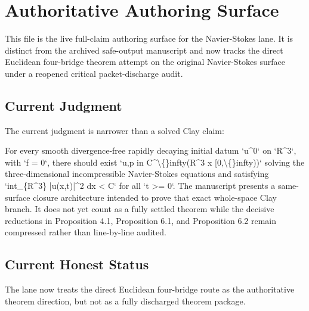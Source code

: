\section{Authoritative Authoring Surface}


This file is the live full-claim authoring surface for the Navier-Stokes lane.
It is distinct from the archived safe-output manuscript and now tracks the
direct Euclidean four-bridge theorem attempt on the original Navier-Stokes
surface under a reopened critical packet-discharge audit.

\subsection{Current Judgment}

The current judgment is narrower than a solved Clay claim:

For every smooth divergence-free rapidly decaying initial datum `u\textasciicircum{}0` on `R\textasciicircum{}3`,
with `f = 0`, there should exist `u,p in C\textasciicircum{}\textbackslash\{\}infty(R\textasciicircum{}3 x [0,\textbackslash\{\}infty))` solving
the three-dimensional incompressible Navier-Stokes equations and satisfying
`int\_\{R\textasciicircum{}3\} |u(x,t)|\textasciicircum{}2 dx < C` for all `t >= 0`. The manuscript presents a
same-surface closure architecture intended to prove that exact whole-space Clay
branch. It does not yet count as a fully settled theorem while the decisive
reductions in Proposition 4.1, Proposition 6.1, and Proposition 6.2 remain
compressed rather than line-by-line audited.

\subsection{Current Honest Status}

The lane now treats the direct Euclidean four-bridge route as the authoritative
theorem direction, but not as a fully discharged theorem package.

